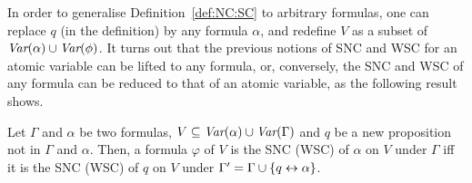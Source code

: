 \documentclass{article}
\begin{document}
In order to generalise Definition~\ref{def:NC:SC} to arbitrary formulas, one can replace $q$ (in the definition)  by any formula $\alpha$, and redefine  $V$ as a subset of $\textit{Var}(\alpha) \cup \textit{Var}(\phi)$.
    It turns out that the previous notions of SNC and WSC for an atomic variable can be lifted to any formula, or, conversely, the SNC and WSC of any formula can be reduced to that of an atomic variable, as the following result shows.
\begin{proposition}\label{formulaNS_to_p}
     Let $\Gamma$ and $\alpha$ be two formulas, $V \subseteq \textit{Var}(\alpha) \cup \textit{Var}(\Gamma)$  and $q$ be a new proposition not in $\Gamma$ and $\alpha$.
 Then, a formula $\varphi$ of $V$ is the SNC (WSC) of $\alpha$ on $V$ under  $\Gamma$ iff it is the SNC (WSC) of $q$ on $V$ under $\Gamma' = \Gamma \cup \{q \leftrightarrow \alpha\}$.
 \end{proposition}

\end{document}
